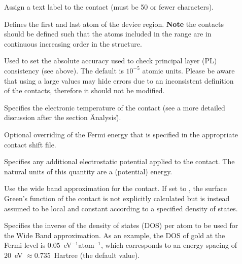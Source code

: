 \begin{description}
\item[] Assign a text label to the contact (must be 50 or fewer
  characters).
\item[]  Defines the first and last atom of the
  device region.  {\bf Note} the contacts should be defined such that the atoms
  included in the range are in continuous increasing order in the structure.
\item[] Used to set the absolute
  accuracy used to check principal layer (PL) consistency (see above). The
  default is $10^{-5}$ atomic units. Please be aware that using a large values
  may hide errors due to an inconsistent definition of the contacts, therefore
  it should not be modified.
\item[] Specifies the electronic
  temperature of the contact (see a more detailed discussion after the section 
  \"Analysis\").
\item[] Optional overriding of the Fermi
  energy that is specified in the appropriate contact shift file.
\item[] Specifies any additional
  electrostatic potential applied to the contact. The natural units of this
  quantity are a (potential) energy.
\item[] Use the wide band approximation for the contact. If set to
  , the surface Green's function of the contact is not explicitly
  calculated but is instead assumed to be local and constant according to a
  specified density of states.
\item[] Specifies the inverse of the
  density of states (DOS) per atom to be used for the Wide Band
  approximation. As an example, the DOS of gold at the Fermi level is
  0.05~eV$^{-1}$atom$^{-1}$, which corresponds to an energy spacing of 20~eV
  $\approx$0.735~Hartree (the default value).
\end{description}

